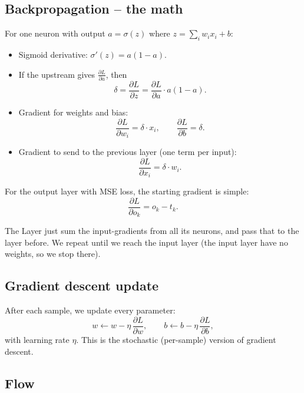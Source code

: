 \documentclass[12pt,a4paper]{article}
\begin{document}
\subsection{Backpropagation -- the math}

For one neuron with output $a = \sigma(z)$ where $z = \sum_i w_i x_i + b$:

\begin{itemize}
    \item Sigmoid derivative: $\sigma'(z) = a(1-a)$.
    \item If the upstream gives $\frac{\partial L}{\partial a}$, then
    \[
        \delta = \frac{\partial L}{\partial z} = \frac{\partial L}{\partial a} \cdot a(1-a).
    \]
    \item Gradient for weights and bias:
    \[
        \frac{\partial L}{\partial w_i} = \delta \cdot x_i, \qquad
        \frac{\partial L}{\partial b} = \delta.
    \]
    \item Gradient to send to the previous layer (one term per input):
    \[
        \frac{\partial L}{\partial x_i} = \delta \cdot w_i.
    \]
\end{itemize}

For the output layer with MSE loss, the starting gradient is simple:
\[
    \frac{\partial L}{\partial o_k} = o_k - t_k.
\]

The Layer just sum the input-gradients from all its neurons, and pass that to the layer before. We repeat until we reach the input layer (the input layer have no weights, so we stop there).

\subsection{Gradient descent update}

After each sample, we update every parameter:
\[
    w \leftarrow w - \eta \, \frac{\partial L}{\partial w}, \qquad
    b \leftarrow b - \eta \, \frac{\partial L}{\partial b},
\]
with learning rate $\eta$. This is the stochastic (per-sample) version of gradient descent.

\subsection{Flow}
\end{document}

